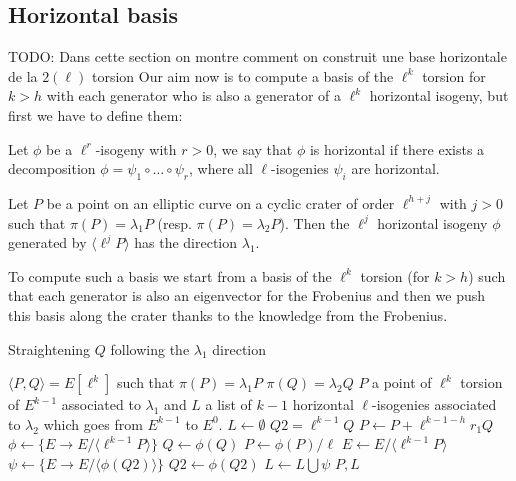 \documentclass{lms}
\newcommand{\todo}[1]{{\color{red}TODO: #1}}
\begin{document}
\subsection{Horizontal basis}
\todo{Dans cette section on montre comment on construit une base horizontale de la $2(\ell)$ torsion}
Our aim now is to compute  a basis of the $\ell^k$ torsion for $k>h$ with each generator who is also a generator of a $\ell^{k}$ horizontal isogeny, but first we have to define them:

\begin{defi}%
Let $\phi$ be a $\ell^r$-isogeny with $r>0$, we say that $\phi$ is horizontal  if there exists a decomposition $\phi = \psi_1 \circ … \circ \psi_r$, where all $\ell$-isogenies $\psi_i$ are horizontal.
\end{defi}

\begin{defi}
Let $P$ be a point on an elliptic curve on a cyclic crater of order $\ell^{h+j}$ with $j>0$ such that $\pi(P)=\lambda_1P$ (resp. $\pi(P)=\lambda_2P$). Then the $\ell^j$ horizontal isogeny $\phi$ generated by $\langle \ell^{j}P \rangle$ has the direction $\lambda_1$.
\end{defi}

To compute such a basis we start from a basis of the $\ell^{k}$ torsion (for $k > h$) such that each generator is also an eigenvector for the Frobenius and then we push this basis along the crater thanks to the knowledge from the Frobenius.

\begin{algorithm}
\caption{\label{1step}Straightening $Q$ following the $\lambda_1$ direction}
\begin{algorithmic}[5]
\REQUIRE $\langle P,Q \rangle = E[\ell^k]$ such that $\pi(P)=\lambda_1P$ $ \pi(Q)=\lambda_2Q$
\ENSURE $P$ a point of $\ell^k$ torsion of $E^{k-1}$ associated to $\lambda_1$ and $L$ a list of $k-1$ horizontal $\ell$-isogenies associated to $\lambda_2$ which goes from $E^{k-1}$ to $E^0$.
\STATE $L \gets \emptyset$
\STATE $Q2= \ell^{k-1}Q$
\STATE $P \gets P+\ell^{k-1-h}r_1Q$
\ENDIF
\STATE $\phi \leftarrow \{ E \rightarrow E/ \langle \ell^{k-1}P \rangle \}$
\STATE $Q \leftarrow \phi(Q)$
\STATE $P \leftarrow \phi(P)/ \ell$
\STATE $E \leftarrow E/ \langle \ell^{k-1}P \rangle$
\STATE $\psi \leftarrow \{ E \rightarrow E/ \langle \phi(Q2) \rangle \}$
\STATE $Q2 \gets \phi(Q2)$
\STATE $L \gets L \bigcup \psi$
\ENDFOR
\RETURN $P,L$
\end{algorithmic}
\end{algorithm}
\end{document}
